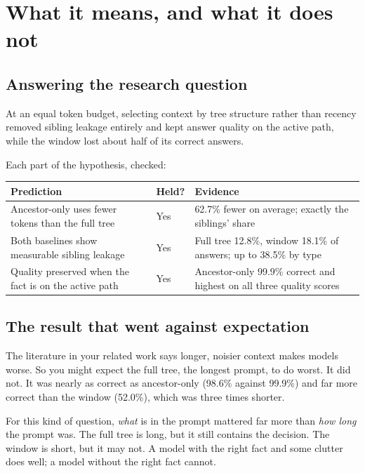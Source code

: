 \chapter{What it means, and what it does not}

\section{Answering the research question}

\begin{paper}
At an equal token budget, selecting context by tree structure rather than recency removed sibling leakage entirely and kept answer quality on the active path, while the window lost about half of its correct answers.
\end{paper}

Each part of the hypothesis, checked:

\begin{center}
\small
\begin{tabularx}{\textwidth}{@{}XlX@{}}
\toprule
Prediction & Held? & Evidence \\
\midrule
Ancestor-only uses fewer tokens than the full tree & Yes & 62.7\% fewer on average; exactly the siblings' share \\
Both baselines show measurable sibling leakage & Yes & Full tree 12.8\%, window 18.1\% of answers; up to 38.5\% by type \\
Quality preserved when the fact is on the active path & Yes & Ancestor-only 99.9\% correct and highest on all three quality scores \\
\bottomrule
\end{tabularx}
\end{center}

\section{The result that went against expectation}

The literature in your related work says longer, noisier context makes models worse. So you might expect the full tree, the longest prompt, to do worst. It did not. It was nearly as correct as ancestor-only (98.6\% against 99.9\%) and far more correct than the window (52.0\%), which was three times shorter.

\begin{plain}
For this kind of question, \emph{what} is in the prompt mattered far more than \emph{how long} the prompt was. The full tree is long, but it still contains the decision. The window is short, but it may not. A model with the right fact and some clutter does well; a model without the right fact cannot.
\end{plain}

